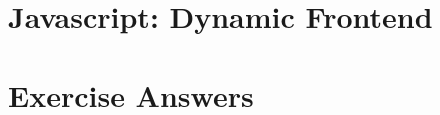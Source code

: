 \documentclass[a4paper,10pt,hidelinks]{report}
\begin{document}
    \chapter{Javascript: Dynamic Frontend} \label{ch:javascript-dynamic-frontend}

    
    
    
    
    
    
    

    \appendix
    \chapter{Exercise Answers}
    
    
    
    
\end{document}
